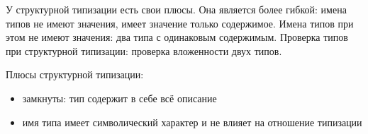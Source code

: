 У структурной типизации есть свои плюсы. Она является более гибкой: имена типов не имеют значения, имеет значение только содержимое. Имена типов при этом не имеют значения: два типа с одинаковым содержимым. Проверка типов при структурной типизации: проверка вложенности двух типов.

Плюсы структурной типизации:
\begin{itemize}
    \item замкнуты: тип содержит в себе всё описание
    \item имя типа имеет символический характер и не влияет на отношение типизации
\end{itemize}
